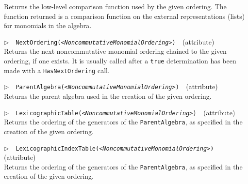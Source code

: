 \documentclass[a4paper,11pt]{report}
\begin{document}
{{{ Returns the low-level comparison function used by the given ordering. The
function returned is a comparison function on the external representations
(lists) for monomials in the algebra. 

 \noindent\textcolor{FuncColor}{$\triangleright$\ \ \texttt{NextOrdering({\mdseries\slshape {\textless}NoncommutativeMonomialOrdering{\textgreater}})
\label{NextOrdering}
}\hfill{\scriptsize (attribute)}}\\


 Returns the next noncommutative monomial ordering chained to the given
ordering, if one exists. It is usually called after a \texttt{true} determination has been made with a \texttt{HasNextOrdering} call. 

 \noindent\textcolor{FuncColor}{$\triangleright$\ \ \texttt{ParentAlgebra({\mdseries\slshape {\textless}NoncommutativeMonomialOrdering{\textgreater}})
\label{ParentAlgebra}
}\hfill{\scriptsize (attribute)}}\\


 Returns the parent algebra used in the creation of the given ordering. 

 \noindent\textcolor{FuncColor}{$\triangleright$\ \ \texttt{LexicographicTable({\mdseries\slshape {\textless}NoncommutativeMonomialOrdering{\textgreater}})
\label{LexicographicTable}
}\hfill{\scriptsize (attribute)}}\\


 Returns the ordering of the generators of the \texttt{ParentAlgebra}, as specified in the creation of the given ordering. 

 \noindent\textcolor{FuncColor}{$\triangleright$\ \ \texttt{LexicographicIndexTable({\mdseries\slshape {\textless}NoncommutativeMonomialOrdering{\textgreater}})
\label{LexicographicIndexTable}
}\hfill{\scriptsize (attribute)}}\\


 Returns the ordering of the generators of the \texttt{ParentAlgebra}, as specified in the creation of the given ordering. 

}}}
\end{document}
